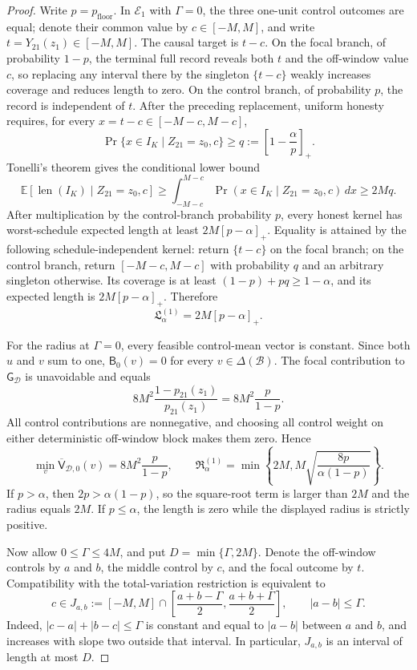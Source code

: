 \documentclass{article}
\begin{document}
\begin{proof}
Write \(p=p_{\mathrm{floor}}\).  In \(\mathcal E_1\) with \(\Gamma=0\), the three one-unit control outcomes are equal; denote their common value by \(c\in[-M,M]\), and write \(t=Y_{21}(z_1)\in[-M,M]\).  The causal target is \(t-c\).  On the focal branch, of probability \(1-p\), the terminal full record reveals both \(t\) and the off-window value \(c\), so replacing any interval there by the singleton \(\{t-c\}\) weakly increases coverage and reduces length to zero.  On the control branch, of probability \(p\), the record is independent of \(t\).  After the preceding replacement, uniform honesty requires, for every \(x=t-c\in[-M-c,M-c]\),
\[
 \Pr\{x\in I_K\mid Z_{21}=z_0,c\}
 \ge q:=\left[1-\frac\alpha p\right]_+.
\]
Tonelli's theorem gives the conditional lower bound
\[
 \mathbb E[\operatorname{len}(I_K)\mid Z_{21}=z_0,c]
 \ge\int_{-M-c}^{M-c}\Pr(x\in I_K\mid Z_{21}=z_0,c)\,dx
 \ge2Mq.
\]
After multiplication by the control-branch probability \(p\), every honest kernel has worst-schedule expected length at least \(2M[p-\alpha]_+\).  Equality is attained by the following schedule-independent kernel: return \(\{t-c\}\) on the focal branch; on the control branch, return \([-M-c,M-c]\) with probability \(q\) and an arbitrary singleton otherwise.  Its coverage is at least \((1-p)+pq\ge1-\alpha\), and its expected length is \(2M[p-\alpha]_+\).  Therefore
\[
 \mathfrak L_\alpha^{(1)}=2M[p-\alpha]_+.
\]

For the radius at \(\Gamma=0\), every feasible control-mean vector is constant.  Since both \(u\) and \(v\) sum to one, \(\mathsf B_0(v)=0\) for every \(v\in\Delta(\mathcal B)\).  The focal contribution to \(\mathsf G_{\mathcal D}\) is unavoidable and equals
\[
 8M^2\frac{1-p_{21}(z_1)}{p_{21}(z_1)}
 =8M^2\frac p{1-p}.
\]
All control contributions are nonnegative, and choosing all control weight on either deterministic off-window block makes them zero.  Hence
\[
 \min_v\overline{\mathsf V}_{\mathcal D,0}(v)
 =8M^2\frac p{1-p},
 \qquad
 \mathfrak R_\alpha^{(1)}
 =\min\left\{2M,M\sqrt{\frac{8p}{\alpha(1-p)}}\right\}.
\]
If \(p>\alpha\), then \(2p>\alpha(1-p)\), so the square-root term is larger than \(2M\) and the radius equals \(2M\).  If \(p\le\alpha\), the length is zero while the displayed radius is strictly positive.

Now allow \(0\le\Gamma\le4M\), and put \(D=\min\{\Gamma,2M\}\).  Denote the off-window controls by \(a\) and \(b\), the middle control by \(c\), and the focal outcome by \(t\).  Compatibility with the total-variation restriction is equivalent to
\[
 c\in J_{a,b}:=[-M,M]\cap
 \left[\frac{a+b-\Gamma}{2},\frac{a+b+\Gamma}{2}\right],
 \qquad |a-b|\le\Gamma.
\]
Indeed, \(|c-a|+|b-c|\le\Gamma\) is constant and equal to \(|a-b|\) between \(a\) and \(b\), and increases with slope two outside that interval.  In particular, \(J_{a,b}\) is an interval of length at most \(D\).


\end{proof}
\end{document}
